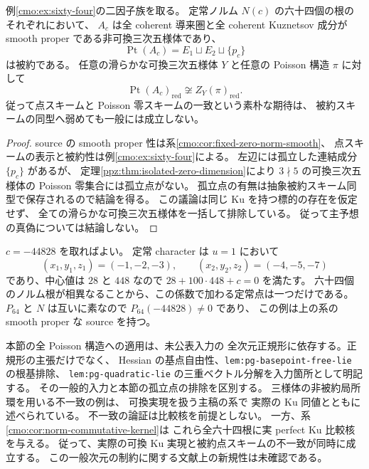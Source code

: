 \begin{corollary}[混合五様体による被約対応の反例]
\label{ppz:cor:reduced-point-poisson-counterexample}
例\ref{cmo:ex:sixty-four}の二因子族を取る。
定常ノルム $N(c)$ の六十四個の根のそれぞれにおいて、
$A_c$ は全 coherent 導来圏と全 coherent Kuznetsov 成分が
smooth proper である非可換三次五様体であり、
\[
 \operatorname{Pt}(A_c)=E_1\sqcup E_2\sqcup\{p_c\}
\]
は被約である。
任意の滑らかな可換三次五様体 $Y$ と任意の Poisson 構造 $\pi$ に対して
\[
 \operatorname{Pt}(A_c)_{\mathrm{red}}
   \not\cong Z_Y(\pi)_{\mathrm{red}}.
\]
従って点スキームと Poisson 零スキームの一致という素朴な期待は、
被約スキームの同型へ弱めても一般には成立しない。
\end{corollary}
\begin{proof}
source の smooth proper 性は系\ref{cmo:cor:fixed-zero-norm-smooth}、
点スキームの表示と被約性は例\ref{cmo:ex:sixty-four}による。
左辺には孤立した連結成分 $\{p_c\}$ があるが、
定理\ref{ppz:thm:isolated-zero-dimension}により
$3\nmid5$ の可換三次五様体の Poisson 零集合には孤立点がない。
孤立点の有無は抽象被約スキーム同型で保存されるので結論を得る。
この議論は同じ Ku を持つ標的の存在を仮定せず、
全ての滑らかな可換三次五様体を一括して排除している。
従って主予想の真偽については結論しない。
\end{proof}

\begin{example}[一つの有理係数の反例]
\label{ppz:ex:reduced-counterexample-rational}
$c=-44828$ を取ればよい。
定常 character は $u=1$ において
\[
 (x_1,y_1,z_1)=(-1,-2,-3),\qquad
 (x_2,y_2,z_2)=(-4,-5,-7)
\]
であり、中心値は $28$ と $448$ なので
$28+100\cdot448+c=0$ を満たす。
六十四個のノルム根が相異なることから、この係数で加わる定常点は一つだけである。
$P_{64}$ と $N$ は互いに素なので $P_{64}(-44828)\ne0$ であり、
この例は上の系の smooth proper な source を持つ。
\end{example}

\begin{remark}[既知入力と未解決点]
本節の全 Poisson 構造への適用は、未公表入力\cite{NCCubicA}の
全次元正規形に依存する。正規形の主張だけでなく、
Hessian の基点自由性、\texttt{lem:pg-basepoint-free-lie} の根基排除、
\texttt{lem:pg-quadratic-lie} の三重ベクトル分解を入力箇所として明記する。
その一般的入力と本節の孤立点の排除を区別する。
三様体の非被約局所環を用いる不一致の例は、
可換実現を扱う主稿の系で
実際の Ku 同値とともに述べられている。
不一致の論証は比較核を前提としない。
一方、系\ref{cmo:cor:norm-commutative-kernel}は
これら全六十四根に実 perfect Ku 比較核を与える。
従って、実際の可換 Ku 実現と被約点スキームの不一致が同時に成立する。
この一般次元の制約に関する文献上の新規性は未確認である。
\end{remark}
